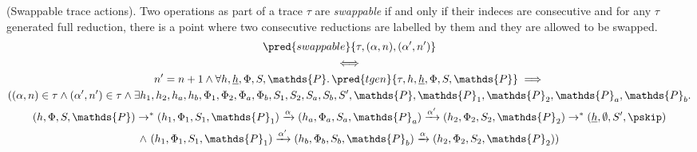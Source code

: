 \begin{defn}
	\label{defn:swappable}
	(Swappable trace actions).
	Two operations as part of a trace  $\tau$ are \emph{swappable} if and only if their indeces are consecutive and for any $\tau$ generated full reduction, there is a point where two consecutive reductions are labelled by them and they are allowed to be swapped.
	\begin{gather*}
		\pred{swappable}{\tau, (\alpha, n), (\alpha', n')} \\
			\iff \\
		n' = n + 1 \land 
		\forall h, \underline{h}, \Phi, S, \mathds{P} \ldotp
		\pred{tgen}{\tau, h, \underline{h}, \Phi, S, \mathds{P}}
			\implies \\
		((\alpha, n) \in \tau
			\land
		(\alpha', n') \in \tau
			\land
		\exists h_1, h_2, h_a, h_b, \Phi_1, \Phi_2, \Phi_a, \Phi_b, S_1, S_2, S_a, S_b, S', \mathds{P}, \mathds{P}_1, \mathds{P}_2, \mathds{P}_a, \mathds{P}_b \ldotp \\
		(h, \Phi, S, \mathds{P})
			\rightarrow^*
		(h_1, \Phi_1, S_1, \mathds{P}_1)
			\xrightarrow{\alpha}
		(h_a, \Phi_a, S_a, \mathds{P}_a)
			\xrightarrow{\alpha'}
		(h_2, \Phi_2, S_2, \mathds{P}_2)
			\rightarrow^*
		(\underline{h}, \emptyset, S', \pskip) \\
			\land\
		(h_1, \Phi_1, S_1, \mathds{P}_1)
			\xrightarrow{\alpha'}
		(h_b, \Phi_b, S_b, \mathds{P}_b)
			\xrightarrow{\alpha}
		(h_2, \Phi_2, S_2, \mathds{P}_2))
	\end{gather*}
\end{defn}

